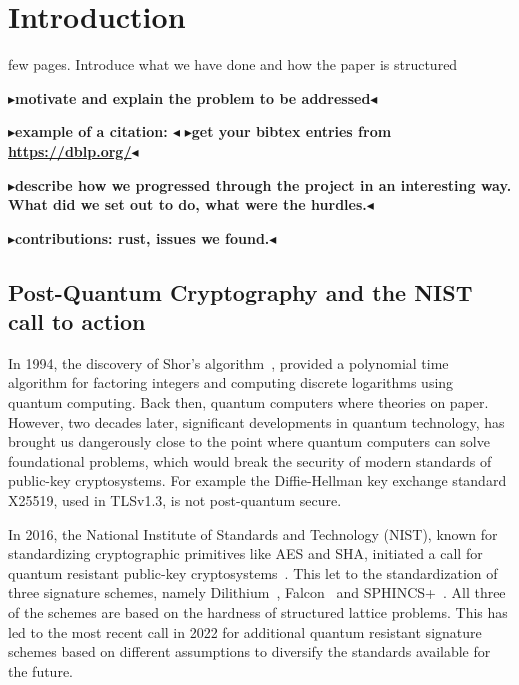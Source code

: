 \documentclass[twoside,11pt,openright]{report}
\theoremstyle{definition}
\theoremstyle{plain}
\newcommand{\todo}[1]{{\color[rgb]{.5,0,0}\textbf{$\blacktriangleright$#1$\blacktriangleleft$}}}
\begin{document}
\chapter{Introduction}
\label{ch:intro}

few pages. Introduce what we have done and how the paper is structured

\todo{motivate and explain the problem to be addressed}

\todo{example of a citation: \cite{DBLP:conf/sas/ChristensenMS03}}
\todo{get your bibtex entries from \url{https://dblp.org/}}

\todo{describe how we progressed through the project in an interesting way. What did we set out to do, what were the hurdles.}

\todo{contributions: rust, issues we found.}

\section{Post-Quantum Cryptography and the NIST call to action}
\label{sec:quantum}

In 1994, the discovery of Shor's algorithm~\cite{shor1997}, provided a polynomial time algorithm for factoring integers and computing discrete logarithms using quantum computing. Back then, quantum computers where theories on paper. However, two decades later, significant developments in quantum technology, has brought us dangerously close to the point where quantum computers can solve foundational problems, which would break the security of modern standards of public-key cryptosystems. For example the Diffie-Hellman key exchange standard X25519, used in TLSv1.3, is not post-quantum secure.

In 2016, the National Institute of Standards and Technology (NIST), known for standardizing cryptographic primitives like AES and SHA, initiated a call for quantum resistant public-key cryptosystems~\cite{nistcall}. This let to the standardization of three signature schemes, namely Dilithium~\cite{ducas2018crystals}, Falcon~\cite{fouque2018falcon} and SPHINCS+~\cite{bernstein2019sphincs+}. All three of the schemes are based on the hardness of structured lattice problems. This has led to the most recent call in 2022 for additional quantum resistant signature schemes based on different assumptions to diversify the standards available for the future.

\end{document}
